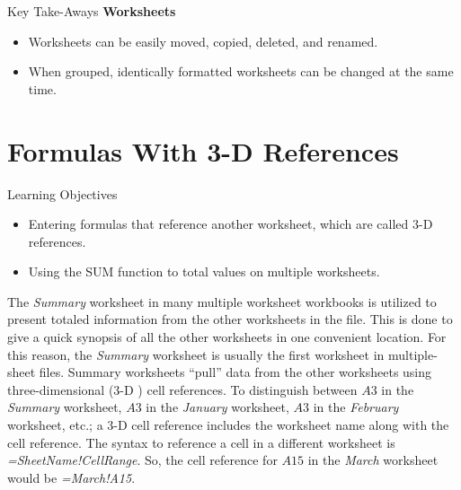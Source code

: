 \begin{center}
	\begin{tkwbox}{Key Take-Aways}
		\textbf{Worksheets}
		\\
		\begin{itemize}
			\setlength{\itemsep}{0pt}
			\setlength{\parskip}{0pt}
			\setlength{\parsep}{0pt}
			
			\item Worksheets can be easily moved, copied, deleted, and renamed.
			\item When grouped, identically formatted worksheets can be changed at the same time.
			
		\end{itemize}
	\end{tkwbox}
\end{center}

\section{Formulas With 3-D References}

\begin{center}
	\begin{objbox}{Learning Objectives}
		\begin{itemize}
			\setlength{\itemsep}{0pt}
			\setlength{\parskip}{0pt}
			\setlength{\parsep}{0pt}

			\item Entering formulas that reference another worksheet, which are called $ 3 $-D references.
			\item Using the SUM function to total values on multiple worksheets.
			
		\end{itemize}
	\end{objbox}
\end{center}

The \textit{Summary} worksheet in many multiple worksheet workbooks is utilized to present totaled information from the other worksheets in the file. This is done to give a quick synopsis of all the other worksheets in one convenient location. For this reason, the \textit{Summary} worksheet is usually the first worksheet in multiple-sheet files. Summary worksheets ``pull'' data from the other worksheets using three-dimensional ($ 3 $-D ) cell references. To distinguish between $ A3 $ in the \textit{Summary} worksheet, $ A3 $ in the \textit{January} worksheet, $ A3 $ in the \textit{February} worksheet, etc.; a $ 3 $-D cell reference includes the worksheet name along with the cell reference. The syntax to reference a cell in a different worksheet is \textit{=SheetName!CellRange}. So, the cell reference for $ A15 $ in the \textit{March} worksheet would be \textit{=March!A15}.

